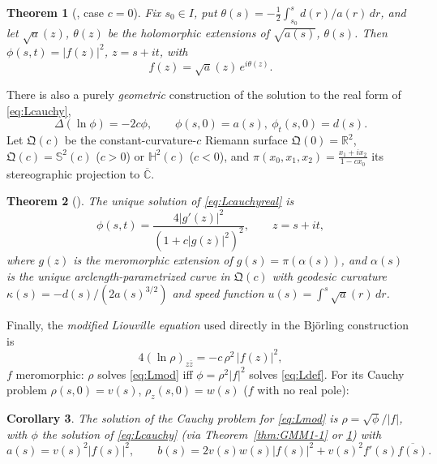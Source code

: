 \documentclass[11pt,a4paper]{article}
\newcommand{\RR}{\mathbb{R}}
\newcommand{\Cbar}{\overline{\mathbb{C}}}           %
\theoremstyle{plain}
\newtheorem{theorem}{Theorem}
\newtheorem{corollary}[theorem]{Corollary}
\theoremstyle{definition}
\theoremstyle{remark}
\begin{document}
\begin{theorem}[{\cite[Thm.\,6]{GMM1}}, case $c=0$]\label{thm:GMM1-6}
Fix $s_0\in I$, put $\theta(s)=-\tfrac12\int_{s_0}^s d(r)/a(r)\,dr$, and
let $\sqrt a(z)$, $\theta(z)$ be the holomorphic extensions of
$\sqrt{a(s)}$, $\theta(s)$. Then $\phi(s,t)=|f(z)|^2$, $z=s+it$, with
\[
  f(z)=\sqrt a(z)\,e^{i\theta(z)}.
\]
\end{theorem}

There is also a purely \emph{geometric} construction of the solution to
the real form of \eqref{eq:Lcauchy},
\begin{equation}\label{eq:Lcauchyreal}
  \Delta(\ln\phi)=-2c\phi, \qquad \phi(s,0)=a(s),\ \phi_t(s,0)=d(s).
\end{equation}
Let $\mathfrak Q(c)$ be the constant-curvature-$c$ Riemann surface
$\mathfrak Q(0)=\RR^2$, $\mathfrak Q(c)=\mathbb S^2(c)$ ($c>0$) or
$\mathbb H^2(c)$ ($c<0$), and $\pi(x_0,x_1,x_2)=\tfrac{x_1+ix_2}{1-cx_0}$
its stereographic projection to $\Cbar$.

\begin{theorem}[{\cite[Thm.\,3]{GMM1}}]\label{thm:GMM1-3}
The unique solution of \eqref{eq:Lcauchyreal} is
\[
  \phi(s,t)=\frac{4|g'(z)|^2}{(1+c|g(z)|^2)^2}, \qquad z=s+it,
\]
where $g(z)$ is the meromorphic extension of $g(s)=\pi(\alpha(s))$, and
$\alpha(s)$ is the unique arclength-parametrized curve in $\mathfrak Q(c)$
with geodesic curvature $\kappa(s)=-d(s)/(2a(s)^{3/2})$ and speed function
$u(s)=\int^s\sqrt{a}(r)\,dr$.
\end{theorem}

Finally, the \emph{modified Liouville equation} used directly in the
Björling construction is
\begin{equation}\label{eq:Lmod}
  4(\ln\rho)_{z\bar z} = -c\,\rho^2\,|f(z)|^2 ,
\end{equation}
$f$ meromorphic: $\rho$ solves \eqref{eq:Lmod} iff $\phi=\rho^2|f|^2$
solves \eqref{eq:Ldef}. For its Cauchy problem
$\rho(s,0)=v(s)$, $\rho_z(s,0)=w(s)$ ($f$ with no real pole):

\begin{corollary}\label{cor:Lmod}
The solution of the Cauchy problem for \eqref{eq:Lmod} is
$\rho=\sqrt\phi/|f|$, with $\phi$ the solution of \eqref{eq:Lcauchy}
(via Theorem~\ref{thm:GMM1-1} or \ref{thm:GMM1-6}) with
\[
  a(s)=v(s)^2|f(s)|^2, \qquad
  b(s)=2v(s)w(s)|f(s)|^2+v(s)^2 f'(s)\overline{f(s)} .
\]
\end{corollary}

\end{document}
